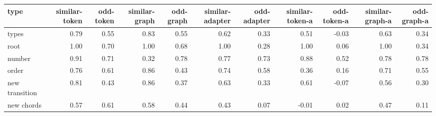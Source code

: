 \begin{tabular}{lrrrrrrrrrr}
\toprule
type & similar-token & odd-token & similar-graph & odd-graph & similar-adapter & odd-adapter & similar-token-a & odd-token-a & similar-graph-a & odd-graph-a \\
\midrule
types & 0.79 & 0.55 & 0.83 & 0.55 & 0.62 & 0.33 & 0.51 & -0.03 & 0.63 & 0.34 \\
root & 1.00 & 0.70 & 1.00 & 0.68 & 1.00 & 0.28 & 1.00 & 0.06 & 1.00 & 0.34 \\
number & 0.91 & 0.71 & 0.32 & 0.78 & 0.77 & 0.73 & 0.88 & 0.52 & 0.78 & 0.78 \\
order & 0.76 & 0.61 & 0.86 & 0.43 & 0.74 & 0.58 & 0.36 & 0.16 & 0.71 & 0.55 \\
new transition & 0.81 & 0.43 & 0.86 & 0.37 & 0.63 & 0.33 & 0.61 & -0.07 & 0.56 & 0.30 \\
new chords & 0.57 & 0.61 & 0.58 & 0.44 & 0.43 & 0.07 & -0.01 & 0.02 & 0.47 & 0.11 \\
\bottomrule
\end{tabular}
